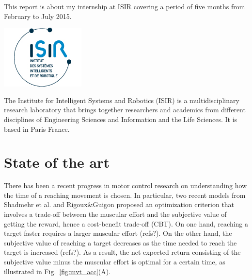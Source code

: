 \documentclass[pdftex,a4paper,11pt]{report}
\begin{document}
This report is about my internship at ISIR covering a period of five months from February to July 2015.
\linebreak 
\linebreak
\linebreak
\begin{minipage}{0.49\textwidth}
	\includegraphics[]{images/logo_isir.jpg}
\end{minipage}
\begin{minipage}{0.49\textwidth}
	The Institute for Intelligent Systems and Robotics (ISIR) is a multidisciplinary research laboratory that brings together researchers and academics from different disciplines of Engineering Sciences and Information and the Life Sciences. It is based in Paris France.
\end{minipage}

\pagebreak

\section{State of the art}

There has been a recent progress in motor control research on understanding how the time of a reaching movement is chosen. In particular, two recent models from Shadmehr et al. \cite{shadmehr10} and Rigoux\&Guigon \cite{rigoux12} proposed an optimization criterion that involves a trade-off between the muscular effort and the subjective value of getting the reward, hence a cost-benefit trade-off (CBT).
On one hand, reaching a target faster requires a larger muscular effort (refs?). On the other hand, the subjective value of reaching a target decreases as the time needed to reach the target is increased (refs?). As a result, the net expected return consisting of the subjective value minus the muscular effort is optimal for a certain time, as illustrated in Fig.~\ref{fig:mvt_acc}(A).
\end{document}
